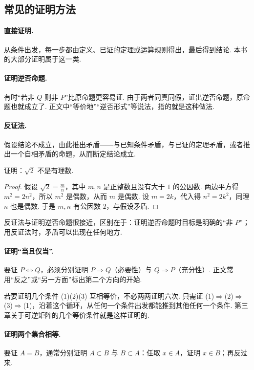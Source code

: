 \subsection{常见的证明方法}

\paragraph*{直接证明.} 从条件出发，每一步都由定义、已证的定理或运算规则得出，最后得到结论. 本书的大部分证明属于这一类.

\paragraph*{证明逆否命题.} 有时“若非 $Q$ 则非 $P$”比原命题更容易证. 由于两者同真同假，证出逆否命题，原命题也就成立了. 正文中“等价地”“逆否形式”等说法，指的就是这种做法.

\paragraph*{反证法.} 假设结论不成立，由此推出矛盾——与已知条件矛盾，与已证的定理矛盾，或者推出一个自相矛盾的命题，从而断定结论成立.

\begin{example}
	证明：$\sqrt2$ 不是有理数.
\end{example}
\begin{proof}
	假设 $\sqrt2=\frac mn$，其中 $m,n$ 是正整数且没有大于 $1$ 的公因数. 两边平方得 $m^2=2n^2$，所以 $m^2$ 是偶数，从而 $m$ 是偶数. 设 $m=2k$，代入得 $n^2=2k^2$，同理 $n$ 也是偶数. 于是 $m,n$ 有公因数 $2$，与假设矛盾.
\end{proof}

反证法与证明逆否命题很接近，区别在于：证明逆否命题时目标是明确的“非 $P$”；用反证法时，矛盾可以出现在任何地方.

\paragraph*{证明“当且仅当”.} 要证 $P\Leftrightarrow Q$，必须分别证明 $P\Rightarrow Q$（必要性）与 $Q\Rightarrow P$（充分性）. 正文常用“反之”或“另一方面”标出第二个方向的开始.

若要证明几个条件 (1)(2)(3) 互相等价，不必两两证明六次. 只需证 (1)$\Rightarrow$(2)$\Rightarrow$(3)$\Rightarrow$(1)，沿着这个循环，从任何一个条件出发都能推到其他任何一个条件. 第三章关于可逆矩阵的几个等价条件就是这样证明的.

\paragraph*{证明两个集合相等.} 要证 $A=B$，通常分别证明 $A\subset B$ 与 $B\subset A$：任取 $x\in A$，证明 $x\in B$；再反过来.

